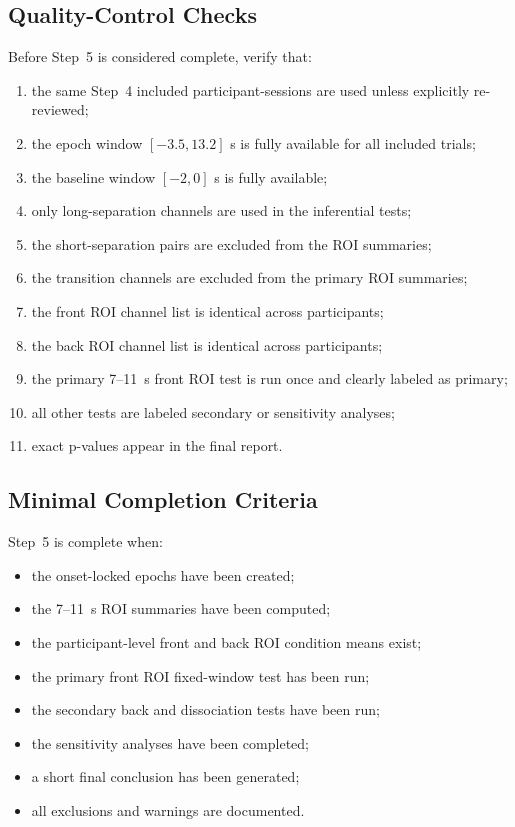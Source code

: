 \subsection{Quality-Control Checks}
Before Step~5 is considered complete, verify that:
\begin{enumerate}
    \item the same Step~4 included participant-sessions are used unless explicitly re-reviewed;
    \item the epoch window \([-3.5, 13.2]\) s is fully available for all included trials;
    \item the baseline window \([-2, 0]\) s is fully available;
    \item only long-separation channels are used in the inferential tests;
    \item the short-separation pairs are excluded from the ROI summaries;
    \item the transition channels are excluded from the primary ROI summaries;
    \item the front ROI channel list is identical across participants;
    \item the back ROI channel list is identical across participants;
    \item the primary 7--11~s front ROI test is run once and clearly labeled as primary;
    \item all other tests are labeled secondary or sensitivity analyses;
    \item exact p-values appear in the final report.
\end{enumerate}

\subsection{Minimal Completion Criteria}
Step~5 is complete when:
\begin{itemize}
    \item the onset-locked epochs have been created;
    \item the 7--11~s ROI summaries have been computed;
    \item the participant-level front and back ROI condition means exist;
    \item the primary front ROI fixed-window test has been run;
    \item the secondary back and dissociation tests have been run;
    \item the sensitivity analyses have been completed;
    \item a short final conclusion has been generated;
    \item all exclusions and warnings are documented.
\end{itemize}

